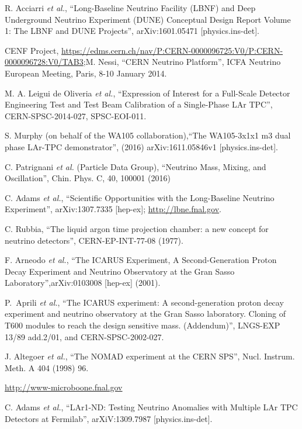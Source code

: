 \begin{thebibliography}{99}
\footnotesize

R. Acciarri {\it et al.}, ``Long-Baseline Neutrino Facility (LBNF) and Deep Underground Neutrino Experiment (DUNE) Conceptual Design Report Volume 1: The LBNF and DUNE Projects'', arXiv:1601.05471  [physics.ins-det].

CENF Project, \url{https://edms.cern.ch/nav/P:CERN-0000096725:V0/P:CERN-0000096728:V0/TAB3};M. Nessi, ``CERN Neutrino Platform'', ICFA Neutrino European Meeting, Paris, 8-10 January 2014. 

M. A. Leigui de Oliveria {\it et al.}, ``Expression of Interest for a Full-Scale Detector Engineering Test and Test Beam Calibration of a Single-Phase LAr TPC'',
CERN-SPSC-2014-027, SPSC-EOI-011.

S. Murphy (on behalf of the WA105 collaboration),``The WA105-3x1x1 m3 dual phase LAr-TPC demonstrator'', (2016) arXiv:1611.05846v1 [physics.ins-det].

C. Patrignani {\it et al.} (Particle Data Group), ``Neutrino Mass, Mixing, and Oscillation'', Chin. Phys. C, 40, 100001 (2016)

C. Adams {\it et al.}, ``Scientific Opportunities with the Long-Baseline Neutrino Experiment'', arXiv:1307.7335 [hep-ex]; \url{http://lbne.fnal.gov}.

C. Rubbia, ``The liquid argon time projection chamber: a new concept for neutrino detectors'', CERN-EP-INT-77-08 (1977).

F. Arneodo {\it et al.}, ``The ICARUS Experiment, A Second-Generation Proton Decay Experiment and Neutrino Observatory at the Gran Sasso Laboratory'',arXiv:0103008 [hep-ex] (2001).

P.~Aprili {\it et al.},
``The ICARUS experiment: A second-generation proton decay experiment and
neutrino observatory at the Gran Sasso laboratory. Cloning of T600 modules to
reach the design sensitive mass. (Addendum)'', 
LNGS-EXP 13/89 add.2/01, and CERN-SPSC-2002-027.

J. Altegoer {\it et al.}, ``The NOMAD experiment at the CERN SPS'', Nucl. Instrum. Meth. A 404 (1998) 96.

\url{http://www-microboone.fnal.gov}

C. Adams  {\it et al.}, ``LAr1-ND: Testing Neutrino Anomalies with Multiple LAr TPC Detectors at Fermilab'', arXiV:1309.7987 [physics.ins-det].


\end{thebibliography}
